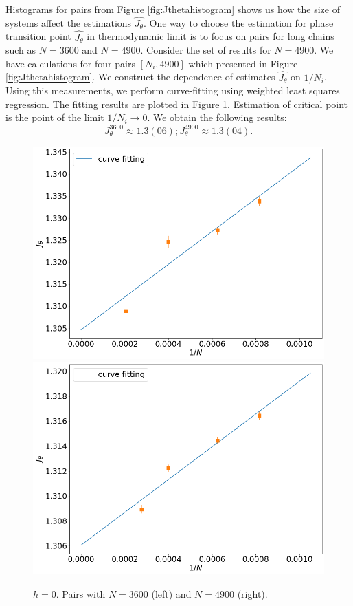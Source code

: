 Histograms for pairs from Figure \ref{fig:Jthetahistogram} shows us how the size of systems affect the estimations $\hat{J_{\theta}}$. One way to choose the estimation for phase transition point $\hat{J_{\theta}}$ in thermodynamic limit is to focus on pairs for long chains such as $N=3600$ and $N=4900$. Consider the set of results for $N=4900$. We have calculations for four pairs $[N_i, 4900]$ which presented in Figure \ref{fig:Jthetahistogram}. We construct the dependence of estimates $\hat{J_{\theta}}$ on $1/N_i$. Using this measurements, we perform curve-fitting using weighted least squares regression. The fitting results are plotted in Figure \ref{fig:JthetaLinear}. Estimation of critical point is the point of the limit $1/N_i \rightarrow 0$. We obtain the following results: 
\begin{equation}
\label{eq:critical_J_theta_2D}
J_{\theta}^{3600} \approx 1.3(06); J_{\theta}^{4900} \approx 1.3(04).
\end{equation}

 \begin{figure}[H]
	\centering
	\includegraphics[scale=0.2]{Images/criticalr2_3600.png}
	\includegraphics[scale=0.2]{Images/criticalr2.png}
	\caption{$h=0$. Pairs with $N=3600$ (left) and $N=4900$ (right).  }
	\label{fig:JthetaLinear}
\end{figure}
 



